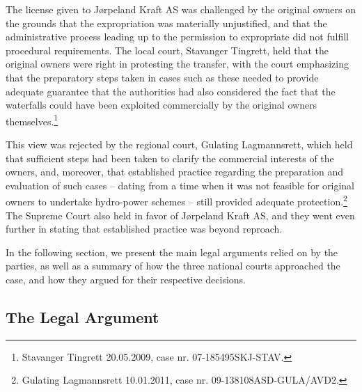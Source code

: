 The license given to Jørpeland Kraft AS was challenged by the original owners on the grounds that the expropriation was materially unjustified, and that the administrative process leading up to the permission to expropriate did not fulfill procedural requirements. The local court, Stavanger Tingrett, held that the original owners were right in protesting the transfer, with the court emphasizing that the preparatory steps taken in cases such as these needed to provide adequate guarantee that the authorities had also considered the fact that the waterfalls could have been exploited commercially by the original owners themselves.\footnote{Stavanger Tingrett 20.05.2009, case nr. 07-185495SKJ-STAV.}

This view was rejected by the regional court, Gulating Lagmannsrett, which held that sufficient steps had been taken to clarify the commercial interests of the owners, and, moreover, that established practice regarding the preparation and evaluation of such cases -- dating from a time when it was not feasible for original owners to undertake hydro-power schemes -- still provided adequate protection.\footnote{Gulating Lagmannsrett 10.01.2011, case nr. 09-138108ASD-GULA/AVD2.} The Supreme Court also held in favor of Jørpeland Kraft AS, and they went even further in stating that established practice was beyond reproach.

In the following section, we present the main legal arguments relied on by the parties, as well as a summary of how the three national courts approached the case, and how they argued for their respective decisions.

\subsection{The Legal Argument}\label{view}


